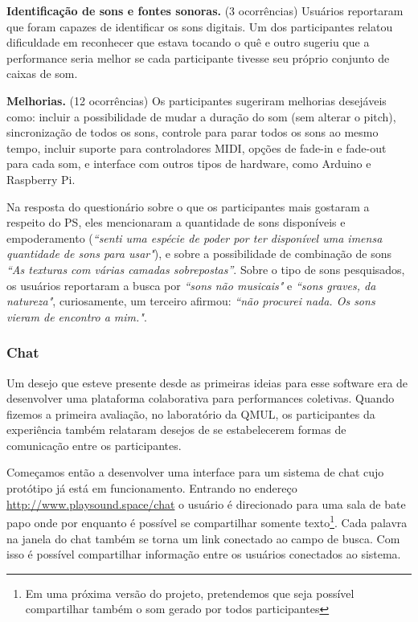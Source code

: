 
\textbf{Identificação de sons e fontes sonoras.} (3 ocorrências)  Usuários reportaram que foram capazes de identificar os sons digitais. Um dos participantes relatou dificuldade em reconhecer que estava tocando o quê e outro sugeriu que a performance seria melhor se cada participante tivesse seu próprio conjunto de caixas de som.

\textbf{Melhorias.} (12 ocorrências) Os participantes sugeriram melhorias desejáveis como: incluir a possibilidade de mudar a duração do som (sem alterar o pitch), sincronização de todos os sons, controle para parar todos os sons ao mesmo tempo, incluir suporte para controladores MIDI, opções de fade-in e fade-out para cada som, e interface com outros tipos de hardware, como Arduino e Raspberry Pi. 

Na resposta do questionário sobre o que os participantes mais gostaram a respeito do PS, eles mencionaram a quantidade de sons disponíveis e empoderamento (\textit{``senti uma espécie de poder por ter disponível uma imensa quantidade de sons para usar"}), e sobre a possibilidade de combinação de sons \textit{``As texturas com várias camadas sobrepostas''}. Sobre o tipo de sons pesquisados, os usuários reportaram a busca por  \textit{``sons não musicais"} e \textit{``sons graves, da natureza"}, curiosamente, um terceiro afirmou: \textit{``não procurei nada. Os sons vieram de encontro a mim."}.

\subsubsection{Chat}
Um desejo que esteve presente desde as primeiras ideias para esse software era de desenvolver uma plataforma colaborativa para performances coletivas. Quando fizemos a primeira avaliação, no laboratório da QMUL, os participantes da experiência também relataram desejos de se estabelecerem formas de comunicação entre os participantes.

Começamos então a desenvolver uma interface para um sistema de chat cujo protótipo já está em funcionamento. Entrando no endereço \url{http://www.playsound.space/chat} o usuário é direcionado para uma sala de bate papo onde por enquanto é possível se compartilhar somente texto\footnote{Em uma próxima versão do projeto, pretendemos que seja possível compartilhar também o som gerado por todos participantes}. Cada palavra na janela do chat também se torna um link conectado ao campo de busca. Com isso é possível compartilhar informação entre os usuários conectados ao sistema.

